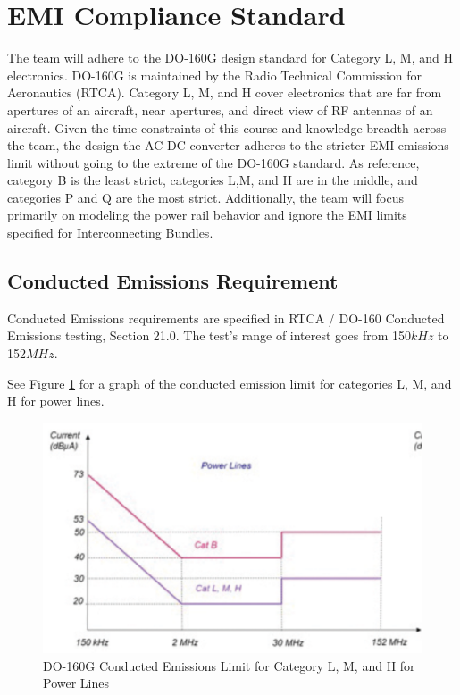 \documentclass[conference]{IEEEtran}
\begin{document}
\section{EMI Compliance Standard}

The team will adhere to the DO-160G design standard for Category L, M, and H electronics. DO-160G is maintained by the Radio Technical Commission for Aeronautics (RTCA). Category L, M, and H cover electronics that are far from apertures of an aircraft, near apertures, and direct view of RF antennas of an aircraft. Given the time constraints of this course and knowledge breadth across the team, the design the AC-DC converter adheres to the stricter EMI emissions limit without going to the extreme of the DO-160G standard. As reference, category B is the least strict, categories L,M, and H are in the middle, and categories P and Q are the most strict. Additionally, the team will focus primarily on modeling the power rail behavior and ignore the EMI limits specified for Interconnecting Bundles.

\subsection{Conducted Emissions Requirement}

Conducted Emissions requirements are specified in RTCA / DO-160 Conducted Emissions testing, Section 21.0. The test's range of interest goes from 150${kHz}$ to 152${MHz}$.

See Figure \ref{fig:do-160g_conducted_emissions_limit_diagram} for a graph of the conducted emission limit for categories L, M, and H for power lines.

\begin{figure}[htbp]
    \centering
    \includegraphics[width=1.0\linewidth]{do-160g_conducted_emissions_limit.png}
    \caption{DO-160G Conducted Emissions Limit for Category L, M, and H for Power Lines}
    \label{fig:do-160g_conducted_emissions_limit_diagram}
\end{figure}
\end{document}
